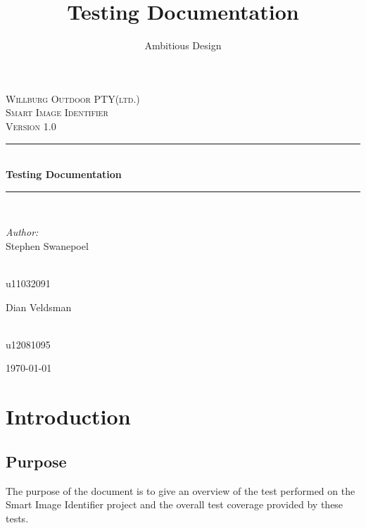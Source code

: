 \documentclass[a4paper,12pt]{report}
\author{Ambitious Design}
\title{Testing Documentation}
\newcommand{\HRule}{\rule{\linewidth}{0.5mm}}
\begin{document}
\setlength{\parskip}{6pt}

\begin{titlepage}

\begin{center}
\textsc{\LARGE Willburg Outdoor PTY(ltd.)}\\[1.5cm]
\textsc{\Large Smart Image Identifier }\\[1.0cm]
\textsc{\Large Version 1.0 }\\[0.5cm]
\HRule \\[0.4cm]
{ \huge \bfseries Testing Documentation}\\[0.4cm]
\HRule \\[0.4cm]
\begin{minipage}{0.4\textwidth}
\begin{flushleft} \large
\emph{Author:}\\
Stephen {Swanepoel}
\end{flushleft}
\end{minipage}
\begin{minipage}{0.4\textwidth}
\begin{flushright} \large
\emph{} \\
u11032091
\end{flushright}
\end{minipage}
\begin{minipage}{0.4\textwidth}
\begin{flushleft} \large
Dian {Veldsman}
\end{flushleft}
\end{minipage}
\begin{minipage}{0.4\textwidth}
\begin{flushright} \large
\emph{} \\
u12081095
\end{flushright}
\end{minipage}


{\large \today}
\end{center}
\end{titlepage}
\footnotesize
\normalsize

\renewcommand{\thesection}{\arabic{section}}
\newpage

\section {Introduction}
	\subsection {Purpose}
		The purpose of the document is to give an overview of the test performed on the Smart Image Identifier project and the overall test coverage provided by these tests.
\end{document}
